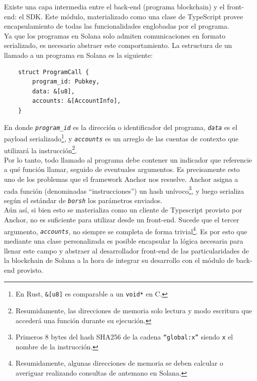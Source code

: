 \begin{multicols}{2}
Existe una capa intermedia entre el back-end (programa blockchain) y el front-end: el SDK. Este módulo, materializado como una clase de TypeScript\cite{ts} provee encapsulamiento de todas las funcionalidades englobadas por el programa.\\

Ya que los programas en Solana solo admiten comunicaciones en formato serializado, es necesario abstraer este comportamiento. La estructura de un llamado a un programa en Solana es la siguiente:

\begin{verbatim}
    struct ProgramCall {
        program_id: Pubkey,
        data: &[u8],
        accounts: &[AccountInfo],
    }
\end{verbatim}

En donde \textit{\texttt{program\_id}} es la dirección o identificador del programa, \textit{\texttt{data}} es el payload serializado\footnote{En Rust, \texttt{\&[u8]} es comparable a un \texttt{void*} en C.}, y \textit{\texttt{accounts}} es un arreglo de las cuentas de contexto que utilizará la instrucción\footnote{Resumidamente, las direcciones de memoria solo lectura y modo escritura que accederá una función durante su ejecución.}.\\

Por lo tanto, todo llamado al programa debe contener un indicador que referencie a qué función llamar, seguido de eventuales argumentos. Es precisamente esto uno de los problemas que el framework Anchor\cite{anchor} nos resuelve. Anchor asigna a cada función (denominadas ``instrucciones'') un hash unívoco\footnote{Primeros 8 bytes del hash SHA256 de la cadena \texttt{``global:x''} siendo \texttt{x} el nombre de la instrucción.}, y luego serializa según el estándar de \textit{\texttt{borsh}}\cite{borsh} los parámetros enviados.\\

Aún así, si bien esto se materializa como un cliente de Typescript provisto por Anchor, no es suficiente para utilizar desde un front-end. Sucede que el tercer argumento, \textit{\texttt{accounts}}, no siempre se completa de forma trivial\footnote{Resumidamente, algunas direcciones de memoria se deben calcular o averiguar realizando consultas de antemano en Solana.}. Es por esto que mediante una clase personalizada es posible encapsular la lógica necesaria para llenar este campo y abstraer al desarrollador front-end de las particularidades de la blockchain de Solana a la hora de integrar su desarrollo con el módulo de back-end provisto.\\


\end{multicols}
